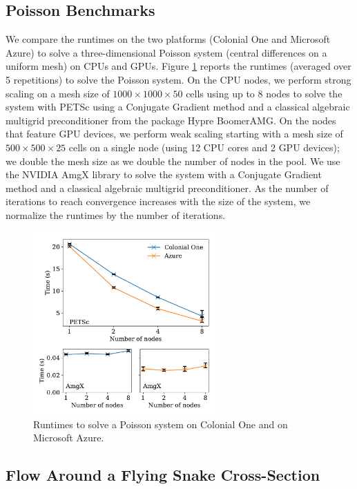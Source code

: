 \documentclass[10pt,journal,compsoc]{IEEEtran}
\begin{document}
\subsection{Poisson Benchmarks}\label{subsec:poisson_benchmarks}

We compare the runtimes on the two platforms (Colonial One and Microsoft Azure) to solve a three-dimensional Poisson system (central differences on a uniform mesh) on CPUs and GPUs.
Figure \ref{fig:poisson_benchmarks} reports the runtimes (averaged over 5 repetitions) to solve the Poisson system.
On the CPU nodes, we perform strong scaling on a mesh size of $1000 \times 1000 \times 50$ cells using up to 8 nodes to solve the system with PETSc using a Conjugate Gradient method and a classical algebraic multigrid preconditioner from the package Hypre BoomerAMG.
On the nodes that feature GPU devices, we perform weak scaling starting with a mesh size of $500 \times 500 \times 25$ cells on a single node (using 12 CPU cores and 2 GPU devices); we double the mesh size as we double the number of nodes in the pool.
We use the NVIDIA AmgX library to solve the system with a Conjugate Gradient method and a classical algebraic multigrid preconditioner.
As the number of iterations to reach convergence increases with the size of the system, we normalize the runtimes by the number of iterations.

\begin{figure}[!h]
    \centering
    \includegraphics[width=7cm]{figures/poisson_time_vs_nodes.pdf}
    \caption{Runtimes to solve a Poisson system on Colonial One and on Microsoft Azure.}
    \label{fig:poisson_benchmarks}
\end{figure}

\subsection{Flow Around a Flying Snake Cross-Section}\label{subsec:snake}
\end{document}
